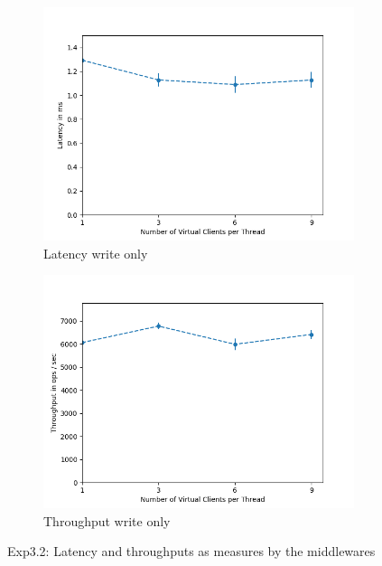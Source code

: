 \documentclass[11pt,a4paper]{article}
\begin{document}
\begin{figure}[H]
\centering
\begin{subfigure}{.5\textwidth}
    \centering
    \includegraphics[width=\textwidth]{img/exp5_1/exp5_1__mw_latency_sharding_False.png}
    \caption{Latency write only}
    \label{fig:mesh1}
\end{subfigure}%
\begin{subfigure}{.5\textwidth}
      \centering
    \includegraphics[width=\textwidth]{img/exp5_1/exp5_1__mw_throughput_sharding_False.png}
    \caption{Throughput write only}
    \label{fig:mesh1}
\end{subfigure}
\caption{Exp3.2: Latency and throughputs as measures by the middlewares}
\label{fig:test}
\end{figure}
\end{document}
